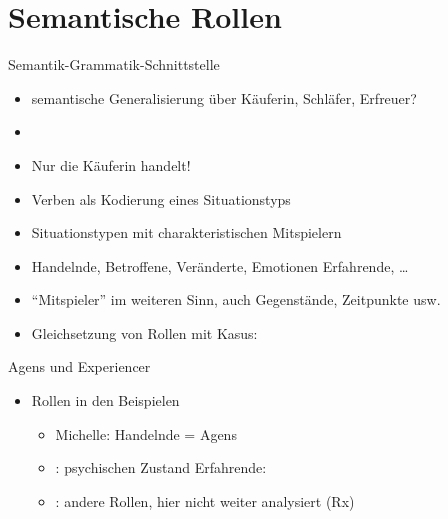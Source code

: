 \section{Semantische Rollen}

\begin{frame}
  {Semantik-Grammatik-Schnittstelle}
  \pause
  \begin{exe}
    \ex
    \begin{xlist}
      \pause
      \pause
    \end{xlist}
  \end{exe}
  \pause
  \Halbzeile
  \begin{itemize}[<+->]
    \item semantische Generalisierung über \alert{Käuferin}, \alert{Schläfer}, \alert{Erfreuer}?
    \item {}
    \item Nur die \alert{Käuferin} handelt!
      \Halbzeile
    \item Verben als Kodierung eines \alert{Situationstyps} 
    \item Situationstypen mit charakteristischen \alert{Mitspielern}
    \item Handelnde, Betroffene, Veränderte, Emotionen Erfahrende, \ldots
    \item "`Mitspieler"' im weiteren Sinn, auch Gegenstände, Zeitpunkte usw.
      \Halbzeile
    \item Gleichsetzung von Rollen mit Kasus: 
  \end{itemize}
\end{frame}

\begin{frame}
  {Agens und Experiencer}
  \pause
  \begin{exe}
    \ex
    \begin{xlist}
    \end{xlist}
  \end{exe}
  \pause
  \Halbzeile
  \begin{itemize}[<+->]
    \item Rollen in den Beispielen
      \begin{itemize}[<+->]
        \item \alert{Michelle}: Handelnde = \alert{Agens}
        \item {}: psychischen Zustand Erfahrende: 
        \item {}: andere Rollen, hier nicht weiter analysiert (Rx)
      \end{itemize}
  \end{itemize}
\end{frame}

